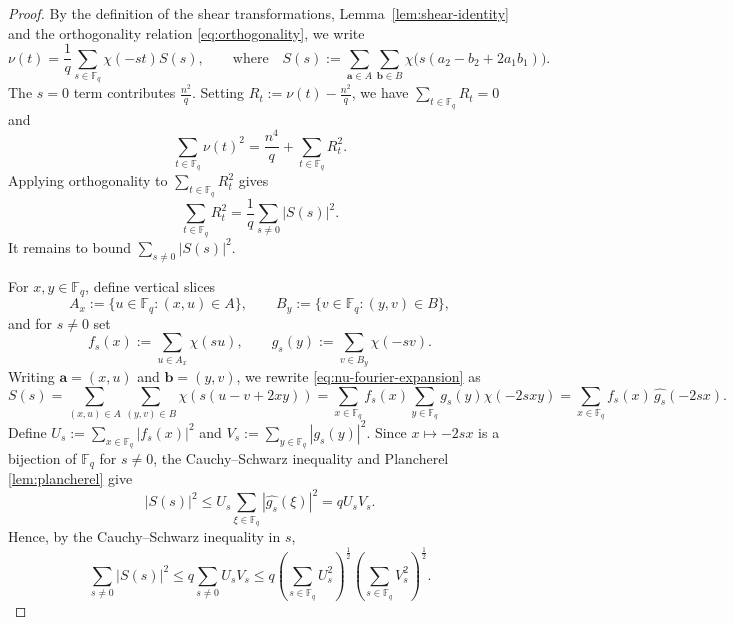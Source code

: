\documentclass{article}
\newcommand{\F}{\mathbb{F}}
\newcommand{\1}{\mathbf{1}}
\begin{document}
\begin{proof}
By the definition of the shear transformations, Lemma~\ref{lem:shear-identity} and the orthogonality relation \eqref{eq:orthogonality}, we write
\begin{equation}\label{eq:nu-fourier-expansion}
\nu(t)
=
\frac{1}{q}\sum_{s\in \F_q}\chi(-st)S(s),
\qquad\text{where}\quad
S(s):=
\sum_{\mathbf{a}\in A}\sum_{\mathbf{b}\in B}\chi\bigl(s(a_2-b_2+2a_1b_1)\bigr).
\end{equation}
The $s=0$ term contributes $\frac{n^2}{q}$. Setting $R_t:=\nu(t)-\frac{n^2}{q}$, we have $\sum\limits_{t\in \F_q} R_t=0$ and
\begin{equation}\label{eq:nu-split}
\sum_{t\in \F_q}\nu(t)^2
=
\frac{n^4}{q}+\sum_{t\in \F_q}R_t^2.
\end{equation}
Applying orthogonality to $\sum\limits_{t\in \F_q} R_t^2$ gives
\begin{equation}\label{eq:R-by-S}
\sum_{t\in \F_q}R_t^2
=
\frac{1}{q}\sum_{s\ne 0}|S(s)|^2.
\end{equation}
It remains to bound $\sum\limits_{s\ne 0}|S(s)|^2$.

For $x,y\in\F_q$, define vertical slices
\[
A_x:=\{u\in\F_q:(x,u)\in A\},
\qquad
B_y:=\{v\in\F_q:(y,v)\in B\},
\]
and for $s\ne 0$ set
\[
f_s(x):=\sum_{u\in A_x}\chi(su),
\qquad
g_s(y):=\sum_{v\in B_y}\chi(-sv).
\]
Writing $\mathbf{a}=(x,u)$ and $\mathbf{b}=(y,v)$, we rewrite \eqref{eq:nu-fourier-expansion} as
\[
S(s)=\sum_{(x,u)\in A}\sum_{(y,v)\in B}\chi(s(u-v+2xy))=\sum_{x\in\mathbb F_q}f_s(x)\sum_{y\in\mathbb F_q}g_s(y)\chi(-2sxy)=\sum_{x\in\F_q}f_s(x)\,\widehat{g_s}(-2sx).
\]
Define $U_s:=\sum\limits_{x\in\F_q}|f_s(x)|^2$ and $V_s:=\sum\limits_{y\in\F_q}|g_s(y)|^2$. Since $x\mapsto -2sx$ is a bijection of $\F_q$ for $s\ne 0$, the Cauchy--Schwarz inequality and Plancherel \eqref{lem:plancherel} give
\begin{equation*}
|S(s)|^2
\le
U_s\sum_{\xi\in\F_q}|\widehat{g_s}(\xi)|^2
=qU_sV_s.
\end{equation*}
Hence, by the Cauchy--Schwarz inequality in $s$,
\begin{equation}\label{eq:sumS-by-UV}
\sum_{s\ne 0}|S(s)|^2
\le
q\sum_{s\ne 0}U_sV_s
\le
q\left(\sum_{s\in\F_q}U_s^2\right)^{\frac{1}{2}}
\left(\sum_{s\in\F_q}V_s^2\right)^{\frac{1}{2}}.
\end{equation}


\end{proof}
\end{document}
